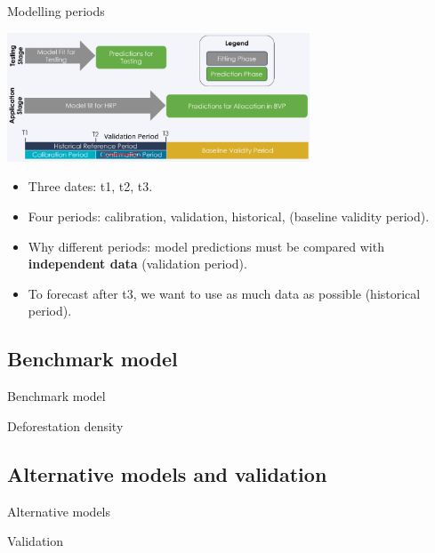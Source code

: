 \documentclass[10pt,table,dvipsnames,compress]{beamer}
\begin{document}
\begin{frame}[label={sec:org7ca12e9}]{Modelling periods}
\begin{center}
\includegraphics[width=9cm]{figs/get_started/periods.png}
\end{center}

\begin{itemize}
\item Three dates: t1, t2, t3.
\item Four periods: calibration, validation, historical, (baseline validity period).
\item Why different periods: model predictions must be compared with \textbf{independent data} (validation period).
\item To forecast after t3, we want to use as much data as possible (historical period).
\end{itemize}
\end{frame}

\subsection{Benchmark model}
\label{sec:org788a721}

\begin{frame}[label={sec:org9ee015b}]{Benchmark model}
\end{frame}

\begin{frame}[label={sec:orgac64b3b}]{Deforestation density}
\end{frame}

\subsection{Alternative models and validation}
\label{sec:org503398b}

\begin{frame}[label={sec:org800b7aa}]{Alternative models}
\end{frame}

\begin{frame}[label={sec:orgecbe8f8}]{Validation}
\end{frame}
\end{document}
